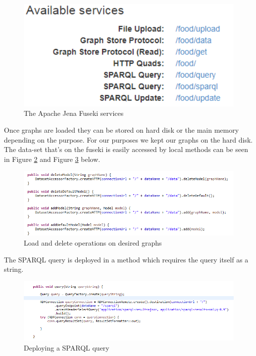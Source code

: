 \documentclass{article}
\begin{document}
\begin{figure}[H]
  \centering
  \includegraphics[width=12cm]{pictures/fuseki_services.png}
  \caption{The Apache Jena Fuseki services}
  \label{fig:fusekiserv}
\end{figure}
\noindent
Once graphs are loaded they can be stored on hard disk or the main memory depending on the purpose. For our purposes we kept our graphs on the hard disk. The data-set that's on the fuseki is easily accessed by local methods can be seen in Figure \ref{fig:fusekild} and Figure \ref{fig:fusekisparql} below.

\begin{figure}[H]
  \centering
  \includegraphics[width=12cm]{pictures/fuseki_loadDelete.png}
  \caption{Load and delete operations on desired graphs}
  \label{fig:fusekild}
\end{figure}
\noindent
The SPARQL query is deployed in a method which requires the query itself as a string.

\begin{figure}[H]
  \centering
  \includegraphics[width=12cm]{pictures/fuseki_conn.png}
  \caption{Deploying a SPARQL query}
  \label{fig:fusekisparql}
\end{figure}
\newpage
\end{document}
